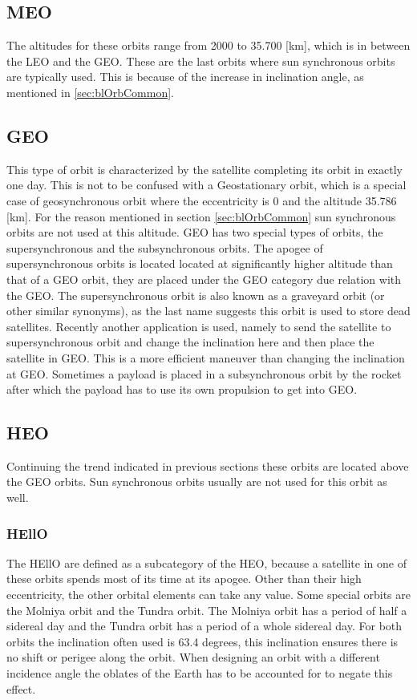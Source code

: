 \subsection{MEO}
\label{sec:blOrb2}
The altitudes for these orbits range from 2000 to 35.700 [km], which is in between the \acs{LEO} and the \ac{GEO}. These are the last orbits where sun synchronous orbits are typically used. This is because of the increase in inclination angle, as mentioned in \ref{sec:blOrbCommon}.

\subsection{GEO}
\label{sec:blOrb3}
This type of orbit is characterized by the satellite completing its orbit in exactly one day. This is not to be confused with a Geostationary orbit, which is a special case of geosynchronous orbit where the eccentricity is 0 and the altitude 35.786 [km].
For the reason mentioned in section \ref{sec:blOrbCommon} sun synchronous orbits are not used at this altitude. \acs{GEO} has two special types of orbits, the supersynchronous and the subsynchronous orbits. 
The apogee of supersynchronous orbits is located located at significantly higher altitude than that of a \acs{GEO} orbit, they are placed under the \acs{GEO} category due relation with the \acs{GEO}. The supersynchronous orbit is also known as a graveyard orbit (or other similar synonyms), as the last name suggests this orbit is used to store dead satellites. Recently another application is used, namely to send the satellite to supersynchronous orbit and change the inclination here and then place the satellite in \acs{GEO}. This is a more efficient maneuver than changing the inclination at \acs{GEO}\cite{jerOrbit}. 
Sometimes a payload is placed in a subsynchronous orbit by the rocket after which the payload has to use its own propulsion to get into \acs{GEO}.

\subsection{HEO}
\label{sec:blOrb4}
Continuing the trend indicated in previous sections these orbits are located above the \acs{GEO} orbits. Sun synchronous orbits usually are not used for this orbit as well.

\subsubsection{HEllO}
\label{sec:blOrb4.5}
The \ac{HEllO} are defined as a subcategory of the \acs{HEO}, because a satellite in one of these orbits spends most of its time at its apogee. Other than their high eccentricity, the other orbital elements can take any value. Some special orbits are the Molniya orbit and the Tundra orbit. The Molniya orbit has a period of half a sidereal day and the Tundra orbit has a period of a whole sidereal day. For both orbits the inclination often used is 63.4 degrees, this inclination ensures there is no shift or perigee along the orbit. When designing an orbit with a different incidence angle the oblates of the Earth has to be accounted for to negate this effect.